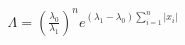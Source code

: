 \documentclass[preview]{standalone}
\begin{document}
\begin{align*}
\Lambda = \left(\frac{\lambda_0}{\lambda_1}\right)^n e^{(\lambda_1-\lambda_0)\sum_{i=1}^n |x_i|}
\end{align*}
\end{document}
